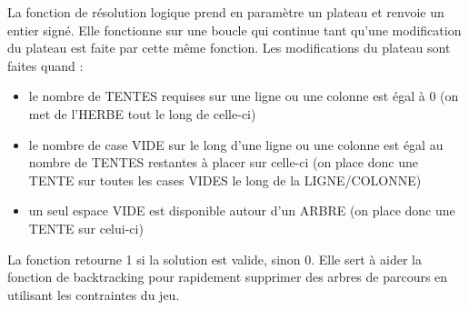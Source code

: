 \documentclass{article}
\begin{document}
    La fonction de résolution logique prend en paramètre un plateau et renvoie un entier signé. Elle fonctionne sur une boucle qui continue tant qu'une modification du plateau est faite par cette même fonction. Les modifications du plateau sont faites quand : 
    \begin{itemize}
    \item le nombre de TENTES requises sur une ligne ou une colonne est égal à 0 (on met de l'HERBE tout le long de celle-ci)
    \item le nombre de case VIDE sur le long d'une ligne ou une colonne est égal au nombre de TENTES restantes à placer sur celle-ci (on place donc une TENTE sur toutes les cases VIDES le long de la LIGNE/COLONNE)
    \item un seul espace VIDE est disponible autour d'un ARBRE (on place donc une TENTE sur celui-ci)
    \end{itemize}
    La fonction retourne 1 si la solution est valide, sinon 0.
    Elle sert à aider la fonction de backtracking pour rapidement supprimer des arbres de parcours en utilisant les contraintes du jeu.
\end{document}
